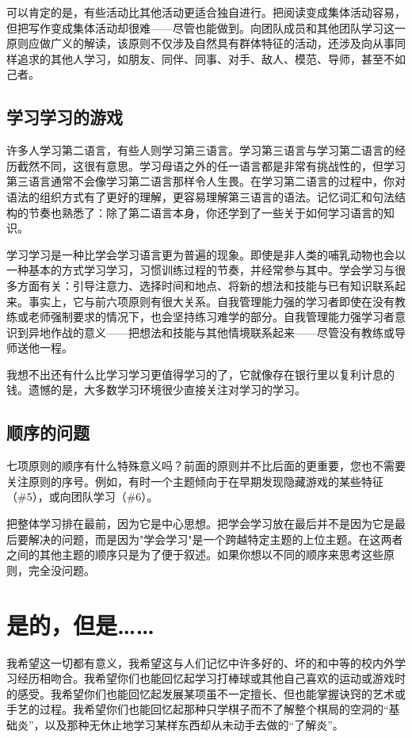 可以肯定的是，有些活动比其他活动更适合独自进行。把阅读变成集体活动容易，但把写作变成集体活动却很难——尽管也能做到。向团队成员和其他团队学习这一原则应做广义的解读，该原则不仅涉及自然具有群体特征的活动，还涉及向从事同样追求的其他人学习，如朋友、同伴、同事、对手、敌人、模范、导师，甚至不如己者。

\subsection*{学习学习的游戏}
许多人学习第二语言，有些人则学习第三语言。学习第三语言与学习第二语言的经历截然不同，这很有意思。学习母语之外的任一语言都是非常有挑战性的，但学习第三语言通常不会像学习第二语言那样令人生畏。在学习第二语言的过程中，你对语法的组织方式有了更好的理解，更容易理解第三语言的语法。记忆词汇和句法结构的节奏也熟悉了：除了第二语言本身，你还学到了一些关于如何学习语言的知识。

学习学习是一种比学会学习语言更为普遍的现象。即使是非人类的哺乳动物也会以一种基本的方式学习学习，习惯训练过程的节奏，并经常参与其中。学会学习与很多方面有关：引导注意力、选择时间和地点、将新的想法和技能与已有知识联系起来。事实上，它与前六项原则有很大关系。自我管理能力强的学习者即使在没有教练或老师强制要求的情况下，也会坚持练习难学的部分。自我管理能力强学习者意识到异地作战的意义——把想法和技能与其他情境联系起来——尽管没有教练或导师送他一程。

我想不出还有什么比学习学习更值得学习的了，它就像存在银行里以复利计息的钱。遗憾的是，大多数学习环境很少直接关注对学习的学习。

\subsection*{顺序的问题}
七项原则的顺序有什么特殊意义吗？前面的原则并不比后面的更重要，您也不需要关注原则的序号。例如，有时一个主题倾向于在早期发现隐藏游戏的某些特征（\#5），或向团队学习（\#6）。

把整体学习排在最前，因为它是中心思想。把学会学习放在最后并不是因为它是最后要解决的问题，而是因为"学会学习"是一个跨越特定主题的上位主题。在这两者之间的其他主题的顺序只是为了便于叙述。如果你想以不同的顺序来思考这些原则，完全没问题。

\section*{是的，但是……}

我希望这一切都有意义，我希望这与人们记忆中许多好的、坏的和中等的校内外学习经历相吻合。我希望你们也能回忆起学习打棒球或其他自己喜欢的运动或游戏时的感受。我希望你们也能回忆起发展某项虽不一定擅长、但也能掌握诀窍的艺术或手艺的过程。我希望你们也能回忆起那种只学棋子而不了解整个棋局的空洞的“基础炎”，以及那种无休止地学习某样东西却从未动手去做的“了解炎”。

